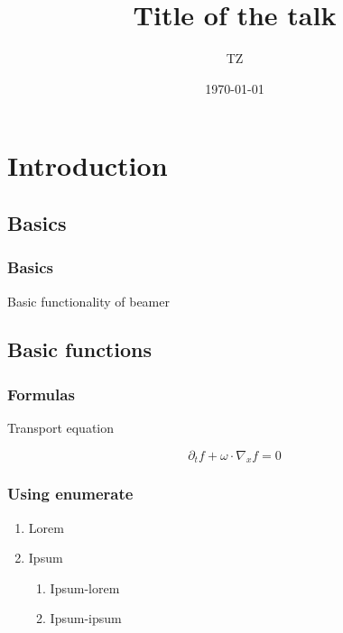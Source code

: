 \documentclass{beamer}
\title{Title of the talk}
\author{TZ}
\institute{CMLS, l'X
}
\date{\today}
\begin{document}
\frametitlepage
\frametoc
\section{Introduction}
\subsection{Basics}
\begin{frame}
	\frametitle{Basics}
Basic functionality of beamer
	
\end{frame}


\subsection{Basic functions}

\begin{frame}
	\frametitle{Formulas}
	Transport equation

	\begin{center}
		 \[\partial_t f+\omega\cdot\nabla_x f =0\]
	\end{center}

\end{frame}

\begin{frame}
\frametitle{Using enumerate}
\begin{enumerate}
\item Lorem 
\item Ipsum
\begin{enumerate}
\item Ipsum-lorem
\item Ipsum-ipsum
\end{enumerate}
\end{enumerate}

\end{frame}
\end{document}
